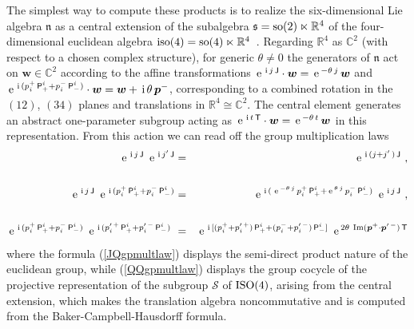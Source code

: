 \documentclass[11pt,a4paper]{article}
\def\nn{\nonumber}
\newcommand{\1}{\mathbb{1}}
\newcommand{\mbf}[1]{{\boldsymbol {#1} }}
\def\ii{{\,{\rm i}\,}}
\def\P{{\sf P}}
\def\T{{\sf T}}
\def\J{{\sf J}}
\def\mw{{\mbf w}}
\def\mbp{{\mbf p}}
\def\mfn{{\mathfrak n}}
\def\mfs{{\mathfrak s}}
\newcommand{\complex}{{\mathbb C}} %
\newcommand{\real}{{\mathbb R}} %
\def\nn{\nonumber}
\def\e{{\,\rm e}\,}
\def\bea{\begin{eqnarray}}
\def\eea{\end{eqnarray}}
\begin{document}
The simplest way to compute these products is to realize the
six-dimensional Lie algebra $\mfn$ as a central
extension of the subalgebra $\mfs={\rm so}(2)\ltimes\real^4$ of the
four-dimensional euclidean algebra
${\rm iso}(4)={\rm
  so}(4)\ltimes\real^4$~\cite{SF-OF1,F-OFS1}. Regarding $\real^4$ as
$\complex^2$ (with respect to a chosen complex structure), for generic
$\theta\neq0$ the generators of $\mfn$ act on $\mw\in\complex^2$
according to the affine transformations $\e^{\ii
  j\,\J}\cdot\mw=\e^{-\theta\,j}\,\mw$ and
$\e^{\ii(p_i^+\,\P^i_++p_i^-\,\P^i_-)}\cdot\mw=\mw+\ii\theta\,\mbp^-$,
corresponding to a combined rotation in the $(12)$, $(34)$ planes and
translations in $\real^4\cong\complex^2$. The central element
generates an abstract one-parameter subgroup acting as $\e^{\ii
  t\,\T}\cdot\mw=\e^{-\theta\,t}\,\mw$ in this representation. From
this action we can read off the group multiplication laws
\bea
\e^{\ii j\,\J}~\e^{\ii j'\,\J}&=&\e^{\ii(j+j'\,)\,\J} \ ,
\label{JJgpmultlaw}\\
{~~~~}^{~~}_{~~}\nn\\\e^{\ii
  j\,\J}~\e^{\ii(p_i^+\,\P^i_++p_i^-\,\P^i_-)}
&=&\e^{\ii(\,\e^{-\theta\,j}\,p_i^+\,\P^i_+
+\e^{\theta\,j}\,p_i^-\,\P^i_-)}~\e^{\ii j\,\J} \ ,
\label{JQgpmultlaw}\\
{~~~~}^{~~}_{~~}\nn\\\e^{\ii(p_i^+\,\P^i_++p_i^-\,\P^i_-)}~
\e^{\ii(p_i^{\prime\,+}\,\P^i_++p_i^{\prime\,-}\,\P^i_-)}~
&=&\e^{\ii[(p_i^++p_i^{\prime\,+})\,\P^i_+
+(p_i^-+p_i^{\prime\,-})\,\P^i_-]}~\e^{2\theta~{\rm Im}(
\mbp^+\cdot\mbp^{\prime\,-})\,\T}
\label{QQgpmultlaw}\eea
where the formula (\ref{JQgpmultlaw}) displays the semi-direct product
nature of the euclidean group, while (\ref{QQgpmultlaw}) displays the
group cocycle of the projective representation of the subgroup
$\mathcal S$ of ${\rm ISO}(4)$, arising from the central extension,
which makes the translation algebra noncommutative and is computed
from the Baker-Campbell-Hausdorff formula.
\end{document}
